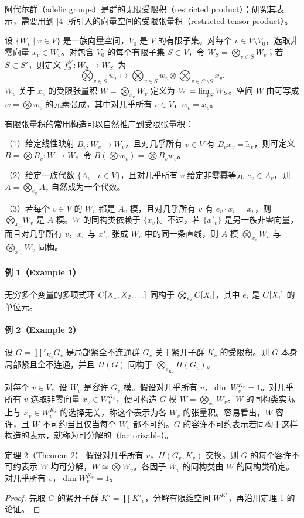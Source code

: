 阿代尔群（adelic groups）是群的无限受限积（restricted product）；研究其表示，需要用到 [4] 所引入的向量空间的受限张量积（restricted tensor product）。

设 $\{W_v\mid v\in V\}$ 是一族向量空间，$V_0$ 是 $V$ 的有限子集。对每个 $v\in V\setminus V_0$，选取非零向量 $x_v\in W_v$。对包含 $V_0$ 的每个有限子集 $S\subset V$，令 $W_S=\bigotimes_{v\in S}W_v$；若 $S\subset S'$，则定义 $f_S^{S'}:W_S\to W_{S'}$ 为
\[
\bigotimes_{v\in S}w_v\longmapsto
\bigotimes_{v\in S}w_v\otimes\bigotimes_{v\in S'\setminus S}x_v.
\]
$W_v$ 关于 $x_v$ 的受限张量积 $W=\bigotimes_{x_v}W_v$ 定义为 $W=\varinjlim_S W_S$。空间 $W$ 由可写成 $w=\bigotimes w_v$ 的元素张成，其中对几乎所有 $v\in V$，$w_v=x_v$。

有限张量积的常用构造可以自然推广到受限张量积：

（1）给定线性映射 $B_v:W_v\to\widetilde W_v$，且对几乎所有 $v\in V$ 有 $B_vx_v=\widetilde x_v$，则可定义 $B=\bigotimes B_v:W\to\widetilde W$，令 $B(\bigotimes w_v)=\bigotimes B_vw_v$。

（2）给定一族代数 $\{A_v\mid v\in V\}$，且对几乎所有 $v$ 给定非零幂等元 $e_v\in A_v$，则 $A=\bigotimes_{e_v}A_v$ 自然成为一个代数。

（3）若每个 $v\in V$ 的 $W_v$ 都是 $A_v$ 模，且对几乎所有 $v$ 有 $e_v\cdot x_v=x_v$，则 $\bigotimes_{x_v}W_v$ 是 $A$ 模。$W$ 的同构类依赖于 $\{x_v\}$。不过，若 $\{x'_v\}$ 是另一族非零向量，而且对几乎所有 $v$，$x_v$ 与 $x'_v$ 张成 $W_v$ 中的同一条直线，则 $A$ 模 $\bigotimes_{x_v}W_v$ 与 $\bigotimes_{x'_v}W_v$ 同构。

\paragraph*{例 1（Example 1）}无穷多个变量的多项式环 $C[X_1,X_2,\ldots]$ 同构于 $\bigotimes_{e_i}C[X_i]$，其中 $e_i$ 是 $C[X_i]$ 的单位元。

\paragraph*{例 2（Example 2）}设 $G=\prod'_{K_v}G_v$ 是局部紧全不连通群 $G_v$ 关于紧开子群 $K_v$ 的受限积。则 $G$ 本身局部紧且全不连通，并且 $H(G)$ 同构于 $\bigotimes_{e_{K_v}}H(G_v)$。

对每个 $v\in V$，设 $W_v$ 是容许 $G_v$ 模。假设对几乎所有 $v$，$\dim W_v^{K_v}=1$。对几乎所有 $v$ 选取非零向量 $x_v\in W_v^{K_v}$，便可构造 $G$ 模 $W=\bigotimes_{x_v}W_v$。$W$ 的同构类实际上与 $x_v\in W_v^{K_v}$ 的选择无关，称这个表示为各 $W_v$ 的张量积。容易看出，$W$ 容许，且 $W$ 不可约当且仅当每个 $W_v$ 都不可约。$G$ 的容许不可约表示若同构于这样构造的表示，就称为可分解的（factorizable）。
\begin{originaltheorem}{定理 2（Theorem 2）}
假设对几乎所有 $v$，$H(G_v,K_v)$ 交换。则 $G$ 的每个容许不可约表示 $W$ 均可分解，$W\simeq\bigotimes W_v$。各因子 $W_v$ 的同构类由 $W$ 的同构类确定。对几乎所有 $v$，$\dim W_v^{K_v}=1$。
\end{originaltheorem}
\begin{proof}
先取 $G$ 的紧开子群 $K'=\prod K'_v$，分解有限维空间 $W^{K'}$，再沿用定理 1 的论证。
\end{proof}

